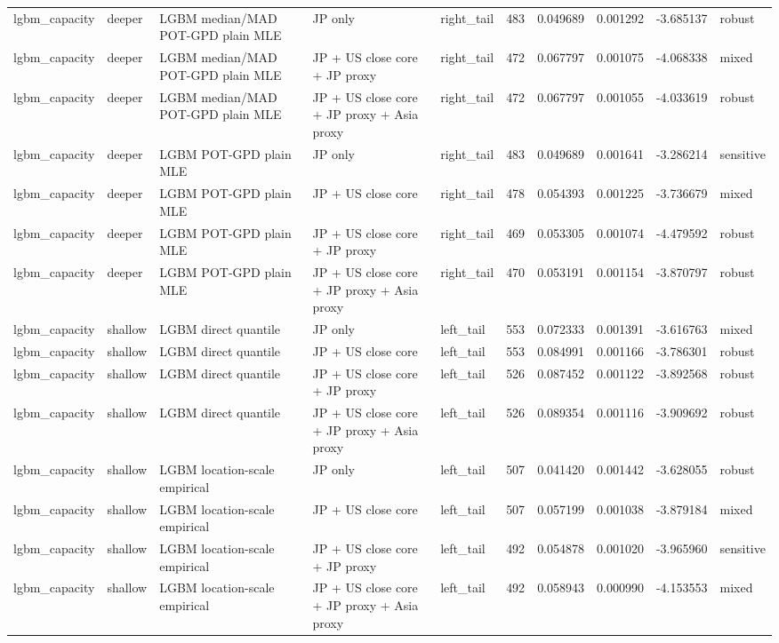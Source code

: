 \begin{tabular}{lll l lrrrrl}
lgbm\_capacity & deeper & LGBM median/MAD POT-GPD plain MLE & JP only & right\_tail & 483 & 0.049689 & 0.001292 & -3.685137 & robust \\
lgbm\_capacity & deeper & LGBM median/MAD POT-GPD plain MLE & JP + US close core + JP proxy & right\_tail & 472 & 0.067797 & 0.001075 & -4.068338 & mixed \\
lgbm\_capacity & deeper & LGBM median/MAD POT-GPD plain MLE & JP + US close core + JP proxy + Asia proxy & right\_tail & 472 & 0.067797 & 0.001055 & -4.033619 & robust \\
lgbm\_capacity & deeper & LGBM POT-GPD plain MLE & JP only & right\_tail & 483 & 0.049689 & 0.001641 & -3.286214 & sensitive \\
lgbm\_capacity & deeper & LGBM POT-GPD plain MLE & JP + US close core & right\_tail & 478 & 0.054393 & 0.001225 & -3.736679 & mixed \\
lgbm\_capacity & deeper & LGBM POT-GPD plain MLE & JP + US close core + JP proxy & right\_tail & 469 & 0.053305 & 0.001074 & -4.479592 & robust \\
lgbm\_capacity & deeper & LGBM POT-GPD plain MLE & JP + US close core + JP proxy + Asia proxy & right\_tail & 470 & 0.053191 & 0.001154 & -3.870797 & robust \\
lgbm\_capacity & shallow & LGBM direct quantile & JP only & left\_tail & 553 & 0.072333 & 0.001391 & -3.616763 & mixed \\
lgbm\_capacity & shallow & LGBM direct quantile & JP + US close core & left\_tail & 553 & 0.084991 & 0.001166 & -3.786301 & robust \\
lgbm\_capacity & shallow & LGBM direct quantile & JP + US close core + JP proxy & left\_tail & 526 & 0.087452 & 0.001122 & -3.892568 & robust \\
lgbm\_capacity & shallow & LGBM direct quantile & JP + US close core + JP proxy + Asia proxy & left\_tail & 526 & 0.089354 & 0.001116 & -3.909692 & robust \\
lgbm\_capacity & shallow & LGBM location-scale empirical & JP only & left\_tail & 507 & 0.041420 & 0.001442 & -3.628055 & robust \\
lgbm\_capacity & shallow & LGBM location-scale empirical & JP + US close core & left\_tail & 507 & 0.057199 & 0.001038 & -3.879184 & mixed \\
lgbm\_capacity & shallow & LGBM location-scale empirical & JP + US close core + JP proxy & left\_tail & 492 & 0.054878 & 0.001020 & -3.965960 & sensitive \\
lgbm\_capacity & shallow & LGBM location-scale empirical & JP + US close core + JP proxy + Asia proxy & left\_tail & 492 & 0.058943 & 0.000990 & -4.153553 & mixed \\

\end{tabular}
